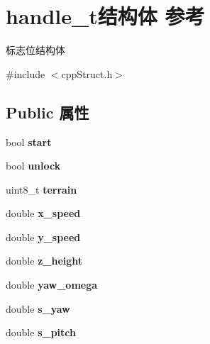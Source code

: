 \hypertarget{structhandle__t}{}\section{handle\+\_\+t结构体 参考}
\label{structhandle__t}


标志位结构体  




{\ttfamily \#include $<$cpp\+Struct.\+h$>$}

\subsection*{Public 属性}
\begin{DoxyCompactItemize}
\item 
\mbox{\label{structhandle__t_a9b8437a0a8457da1d58c0c3bcd794734}} 
bool {\bfseries start}
\item 
\mbox{\label{structhandle__t_ad4ea92fd72901046c05b9ebfcc068f22}} 
bool {\bfseries unlock}
\item 
\mbox{\label{structhandle__t_adf84a1e20d4ea39644a4e7731474e769}} 
uint8\+\_\+t {\bfseries terrain}
\item 
\mbox{\label{structhandle__t_a99d1178b7440a0cff42eae05db115b98}} 
double {\bfseries x\+\_\+speed}
\item 
\mbox{\label{structhandle__t_a9bcac00bdfba0c0a8c195840d3f19a24}} 
double {\bfseries y\+\_\+speed}
\item 
\mbox{\label{structhandle__t_ab7295e8d71f5c5f0eb1026a69e65eed9}} 
double {\bfseries z\+\_\+height}
\item 
\mbox{\label{structhandle__t_a5996e395d20efcfe338ee46b6c966642}} 
double {\bfseries yaw\+\_\+omega}
\item 
\mbox{\label{structhandle__t_a50a967933dfe95e52d18e382d63d5438}} 
double {\bfseries s\+\_\+yaw}
\item 
\mbox{\label{structhandle__t_aee9f102b30cf45e3f75ce546b5118f2f}} 
double {\bfseries s\+\_\+pitch}

\end{DoxyCompactItemize}
